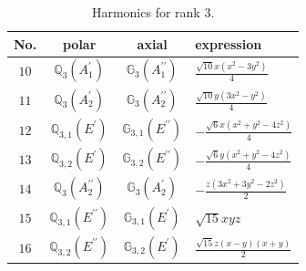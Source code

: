 \documentclass[fleqn,8pt,landscape]{jsarticle}
\begin{document}
\begin{table}[ht!]
\begin{center}
\caption{Harmonics for rank 3.}
\renewcommand{\arraystretch}{1.3}
\begin{tabular}{cccl} \hline \hline
No. & polar & axial & expression \\ \hline
$ 10 $ & $ \mathbb{Q}_{3}(A_{1}^{\prime}) $ & $ \mathbb{G}_{3}(A_{1}^{\prime\prime}) $ & $ \frac{\sqrt{10} x \left(x^{2} - 3 y^{2}\right)}{4} $ \\
$ 11 $ & $ \mathbb{Q}_{3}(A_{2}^{\prime}) $ & $ \mathbb{G}_{3}(A_{2}^{\prime\prime}) $ & $ \frac{\sqrt{10} y \left(3 x^{2} - y^{2}\right)}{4} $ \\
$ 12 $ & $ \mathbb{Q}_{3,1}(E^{\prime}) $ & $ \mathbb{G}_{3,1}(E^{\prime\prime}) $ & $ - \frac{\sqrt{6} x \left(x^{2} + y^{2} - 4 z^{2}\right)}{4} $ \\
$ 13 $ & $ \mathbb{Q}_{3,2}(E^{\prime}) $ & $ \mathbb{G}_{3,2}(E^{\prime\prime}) $ & $ - \frac{\sqrt{6} y \left(x^{2} + y^{2} - 4 z^{2}\right)}{4} $ \\
$ 14 $ & $ \mathbb{Q}_{3}(A_{2}^{\prime\prime}) $ & $ \mathbb{G}_{3}(A_{2}^{\prime}) $ & $ - \frac{z \left(3 x^{2} + 3 y^{2} - 2 z^{2}\right)}{2} $ \\
$ 15 $ & $ \mathbb{Q}_{3,1}(E^{\prime\prime}) $ & $ \mathbb{G}_{3,1}(E^{\prime}) $ & $ \sqrt{15} x y z $ \\
$ 16 $ & $ \mathbb{Q}_{3,2}(E^{\prime\prime}) $ & $ \mathbb{G}_{3,2}(E^{\prime}) $ & $ \frac{\sqrt{15} z \left(x - y\right) \left(x + y\right)}{2} $ \\
 \hline \hline
\end{tabular}
\end{center}
\end{table}
\end{document}
